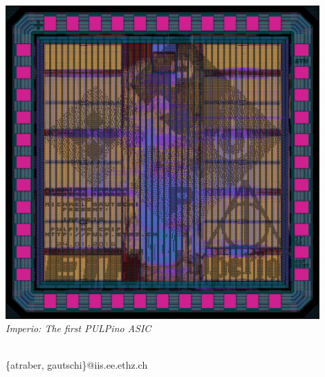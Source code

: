 \makeatletter
\begin{titlepage}

 \thispagestyle{empty}

 \begin{center}

  \begin{spacing}{2.0}
  {\Huge\textbf{\@title}}
  \end{spacing}

  \vspace{0.2cm}

  \vfill

  \includegraphics[height = 12cm]{figures/imperio_layout} \\
  {\textit{Imperio: The first PULPino ASIC}}

  \vfill

  {\Large \@author}\\
  {\{atraber, gautschi\}@iis.ee.ethz.ch}
  \vfill
  \@date

 \end{center}
\end{titlepage}
\makeatother

